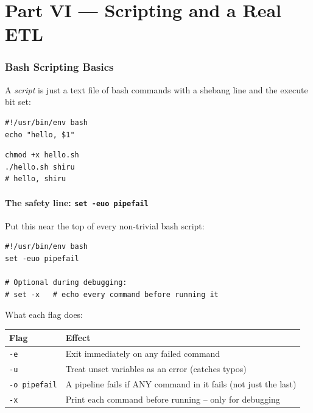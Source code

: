 \documentclass[11pt,a4paper]{article}
\begin{document}
\clearpage
\part*{Part VI --- Scripting and a Real ETL}

\section{Bash Scripting Basics}
\label{sec:scripting}

A \emph{script} is just a text file of bash commands with a shebang
line and the execute bit set:

\begin{lstlisting}[style=bashstyle]
#!/usr/bin/env bash
echo "hello, $1"
\end{lstlisting}

\begin{lstlisting}[style=bashstyle]
chmod +x hello.sh
./hello.sh shiru
# hello, shiru
\end{lstlisting}

\subsection*{The safety line: \texttt{set -euo pipefail}}

Put this near the top of every non-trivial bash script:

\begin{lstlisting}[style=bashstyle]
#!/usr/bin/env bash
set -euo pipefail

# Optional during debugging:
# set -x   # echo every command before running it
\end{lstlisting}

What each flag does:

\begin{center}
\begin{tabular}{ll}
\toprule
\textbf{Flag} & \textbf{Effect} \\
\midrule
\texttt{-e}             & Exit immediately on any failed command \\
\texttt{-u}             & Treat unset variables as an error (catches typos) \\
\texttt{-o pipefail}    & A pipeline fails if ANY command in it fails (not just the last) \\
\texttt{-x}             & Print each command before running -- only for debugging \\
\bottomrule
\end{tabular}
\end{center}
\end{document}
